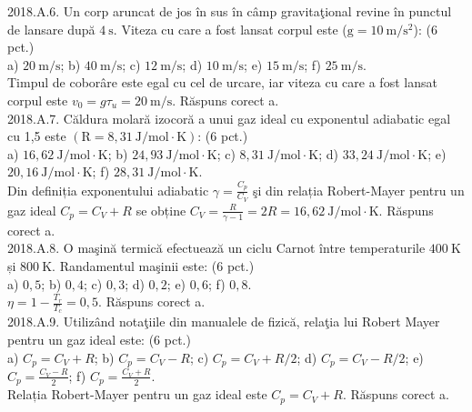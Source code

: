 2018.A.6. Un corp aruncat de jos în sus în câmp gravitaţional revine în punctul de lansare după $4 \mathrm{~s}$. Viteza cu care a fost lansat corpul este ($\mathrm{g}=10 \mathrm{~m} / \mathrm{s}^{2}$): (6 pct.)\\ a) $20 \mathrm{~m} / \mathrm{s}$; b) $40 \mathrm{~m} / \mathrm{s}$; c) $12 \mathrm{~m} / \mathrm{s}$; d) $10 \mathrm{~m} / \mathrm{s}$; e) $15 \mathrm{~m} / \mathrm{s}$; f) $25 \mathrm{~m} / \mathrm{s}$.\\ Timpul de coborâre este egal cu cel de urcare, iar viteza cu care a fost lansat corpul este $v_{0}=g \tau_{u}=20 \mathrm{~m} / \mathrm{s}$. Răspuns corect a.\\

2018.A.7. Căldura molară izocoră a unui gaz ideal cu exponentul adiabatic egal cu 1,5 este $(\mathrm{R}=8,31 \mathrm{~J} / \mathrm{mol} \cdot \mathrm{K})$: (6 pct.)\\ a) $16,62 \mathrm{~J} / \mathrm{mol} \cdot \mathrm{K}$; b) $24,93 \mathrm{~J} / \mathrm{mol} \cdot \mathrm{K}$; c) $8,31 \mathrm{~J} / \mathrm{mol} \cdot \mathrm{K}$; d) $33,24 \mathrm{~J} / \mathrm{mol} \cdot \mathrm{K}$; e) $20,16 \mathrm{~J} / \mathrm{mol} \cdot \mathrm{K}$; f) $28,31 \mathrm{~J} / \mathrm{mol} \cdot \mathrm{K}$.\\  Din definiția exponentului adiabatic $\gamma=\frac{C_{p}}{C_{V}}$ şi din relația Robert-Mayer pentru un gaz ideal $C_{p}=C_{V}+R$ se obține $C_{V}=\frac{R}{\gamma-1}=2 R=16,62 \mathrm{~J} / \mathrm{mol} \cdot \mathrm{K}$. Răspuns corect a.\\

2018.A.8. O maşină termică efectuează un ciclu Carnot între temperaturile $400 \mathrm{~K}$ și $800 \mathrm{~K}$. Randamentul maşinii este: (6 pct.)\\ a) $0,5$; b) $0,4$; c) $0,3$; d) $0,2$; e) $0,6$; f) $0,8$.\\ $\eta=1-\frac{T_{r}}{T_{c}}=0,5$. Răspuns corect a.\\

2018.A.9. Utilizând notaţiile din manualele de fizică, relaţia lui Robert Mayer pentru un gaz ideal este: (6 pct.)\\ a) $C_{p}=C_{V}+R$; b) $C_{p}=C_{V}-R$; c) $C_{p}=C_{V}+R / 2$; d) $C_{p}=C_{V}-R / 2$; e) $C_{p}=\frac{C_{V}-R}{2}$; f) $C_{p}=\frac{C_{V}+R}{2}$.\\ Relația Robert-Mayer pentru un gaz ideal este $C_{p}=C_{V}+R$. Răspuns corect a.\\

